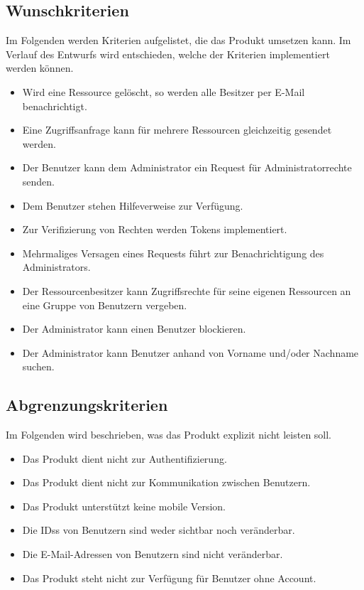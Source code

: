 \documentclass[parskip=full,11pt]{scrartcl}
\begin{document}
\subsection{Wunschkriterien}
Im Folgenden werden Kriterien aufgelistet, die das Produkt umsetzen kann.
Im Verlauf des Entwurfs wird entschieden, welche der Kriterien  implementiert werden können.
\begin{itemize}[itemsep=0pt]
\item Wird eine Ressource gelöscht, so werden alle Besitzer per E-Mail benachrichtigt. 
\item Eine Zugriffsanfrage kann für mehrere Ressourcen gleichzeitig gesendet werden.
\item Der Benutzer kann dem Administrator ein Request für Administratorrechte senden.
\item Dem Benutzer stehen Hilfeverweise zur Verfügung.
\item Zur Verifizierung von Rechten werden \glspl{Token} implementiert.
\item Mehrmaliges Versagen eines Requests führt zur Benachrichtigung des Administrators.
\item Der Ressourcenbesitzer kann Zugriffsrechte für seine eigenen Ressourcen an eine Gruppe von Benutzern vergeben.
\item Der Administrator kann einen Benutzer blockieren.
\item Der Administrator kann Benutzer anhand von Vorname und/oder Nachname suchen.
\end{itemize}
\newpage


\subsection{Abgrenzungskriterien}
Im Folgenden wird beschrieben, was das Produkt explizit nicht leisten soll.
\begin{itemize}[itemsep=0pt]
\item Das Produkt dient nicht zur Authentifizierung.
\item Das Produkt dient nicht zur Kommunikation zwischen Benutzern.
\item Das Produkt unterstützt keine mobile Version.
\item Die \glspl{IDs} von Benutzern sind weder sichtbar noch veränderbar.
\item Die E-Mail-Adressen von Benutzern sind nicht veränderbar.
\item Das Produkt steht nicht zur Verfügung für Benutzer ohne Account.
\end{itemize}
\end{document}
